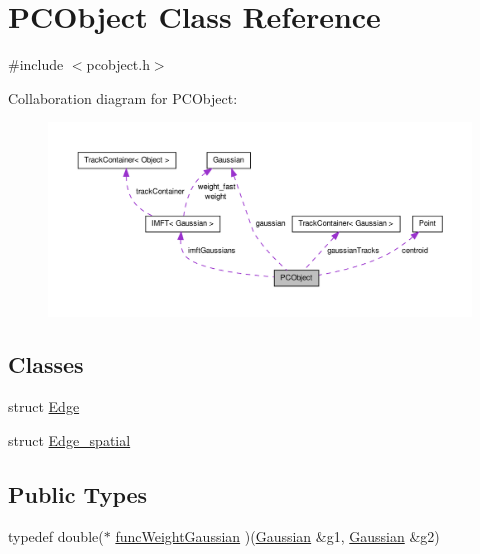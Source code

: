 \hypertarget{class_p_c_object}{\section{\-P\-C\-Object \-Class \-Reference}
\label{class_p_c_object}
}


{\ttfamily \#include $<$pcobject.\-h$>$}



\-Collaboration diagram for \-P\-C\-Object\-:
\nopagebreak
\begin{figure}[H]
\begin{center}
\leavevmode
\includegraphics[width=350pt]{class_p_c_object__coll__graph}
\end{center}
\end{figure}
\subsection*{\-Classes}
\begin{DoxyCompactItemize}
\item 
struct \hyperlink{struct_p_c_object_1_1_edge}{\-Edge}
\item 
struct \hyperlink{struct_p_c_object_1_1_edge__spatial}{\-Edge\-\_\-spatial}
\end{DoxyCompactItemize}
\subsection*{\-Public \-Types}
\begin{DoxyCompactItemize}
\item 
typedef double($\ast$ \hyperlink{class_p_c_object_a57717df0ff6fbc92e693c08485479da3}{func\-Weight\-Gaussian} )(\hyperlink{class_gaussian}{\-Gaussian} \&g1, \hyperlink{class_gaussian}{\-Gaussian} \&g2)
\end{DoxyCompactItemize}
